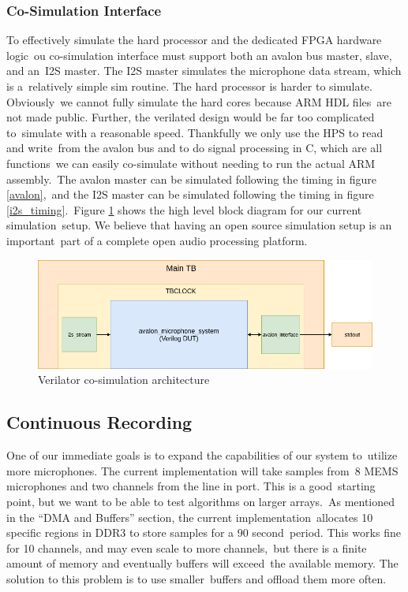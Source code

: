 \documentclass{article}
\begin{document}
\subsubsection{Co-Simulation Interface}
To effectively simulate the hard processor and the dedicated FPGA hardware logic\
ou co-simulation interface must support both an avalon bus master, slave, and an\
I2S master. The I2S master simulates the microphone data stream, which is a\
relatively simple sim routine. The hard processor is harder to simulate. Obviously\
we cannot fully simulate the hard cores because ARM HDL files\
are not made public. Further, the verilated design would be far too complicated to\
simulate with a reasonable speed. Thankfully we only use the HPS to read and write\
from the avalon bus and to do signal processing in C, which are all functions\
we can easily co-simulate without needing to run the actual ARM assembly.\
The avalon master can be simulated following the timing in figure \ref{avalon},\
and the I2S master can be simulated following the timing in figure \ref{i2s_timing}.\
Figure \ref{verilator} shows the high level block diagram for our current simulation\
setup. We believe that having an open source simulation setup is an important\
part of a complete open audio processing platform.

\begin{figure}[ht]
	\begin{center}
	\includegraphics[scale=.3]{pictures/myblock.png}
	\caption{Verilator co-simulation architecture}
	\label{verilator}
	\end{center}
\end{figure}

\subsection{Continuous Recording}
One of our immediate goals is to expand the capabilities of our system to\
utilize more microphones. The current implementation will take samples from\
8 MEMS microphones and two channels from the line in port. This is a good\
starting point, but we want to be able to test algorithms on larger arrays.\
As mentioned in the ``DMA and Buffers'' section, the current implementation\
allocates 10 specific regions in DDR3 to store samples for a 90 second\
period. This works fine for 10 channels, and may even scale to more channels,\
but there is a finite amount of memory and eventually buffers will exceed\
the available memory. The solution to this problem is to use smaller\
buffers and offload them more often.
\end{document}
